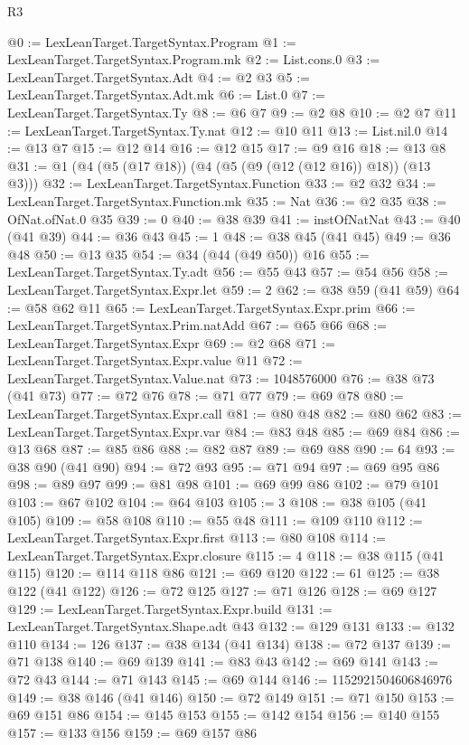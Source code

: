 \begin{lexlean}{R3}
\begin{coremodule}
@0 := LexLeanTarget.TargetSyntax.Program
@1 := LexLeanTarget.TargetSyntax.Program.mk
@2 := List.cons.{0}
@3 := LexLeanTarget.TargetSyntax.Adt
@4 := @2 @3
@5 := LexLeanTarget.TargetSyntax.Adt.mk
@6 := List.{0}
@7 := LexLeanTarget.TargetSyntax.Ty
@8 := @6 @7
@9 := @2 @8
@10 := @2 @7
@11 := LexLeanTarget.TargetSyntax.Ty.nat
@12 := @10 @11
@13 := List.nil.{0}
@14 := @13 @7
@15 := @12 @14
@16 := @12 @15
@17 := @9 @16
@18 := @13 @8
@31 := @1 (@4 (@5 (@17 @18)) (@4 (@5 (@9 (@12 (@12 @16)) @18)) (@13 @3)))
@32 := LexLeanTarget.TargetSyntax.Function
@33 := @2 @32
@34 := LexLeanTarget.TargetSyntax.Function.mk
@35 := Nat
@36 := @2 @35
@38 := OfNat.ofNat.{0} @35
@39 := 0
@40 := @38 @39
@41 := instOfNatNat
@43 := @40 (@41 @39)
@44 := @36 @43
@45 := 1
@48 := @38 @45 (@41 @45)
@49 := @36 @48
@50 := @13 @35
@54 := @34 (@44 (@49 @50)) @16
@55 := LexLeanTarget.TargetSyntax.Ty.adt
@56 := @55 @43
@57 := @54 @56
@58 := LexLeanTarget.TargetSyntax.Expr.let
@59 := 2
@62 := @38 @59 (@41 @59)
@64 := @58 @62 @11
@65 := LexLeanTarget.TargetSyntax.Expr.prim
@66 := LexLeanTarget.TargetSyntax.Prim.natAdd
@67 := @65 @66
@68 := LexLeanTarget.TargetSyntax.Expr
@69 := @2 @68
@71 := LexLeanTarget.TargetSyntax.Expr.value @11
@72 := LexLeanTarget.TargetSyntax.Value.nat
@73 := 1048576000
@76 := @38 @73 (@41 @73)
@77 := @72 @76
@78 := @71 @77
@79 := @69 @78
@80 := LexLeanTarget.TargetSyntax.Expr.call
@81 := @80 @48
@82 := @80 @62
@83 := LexLeanTarget.TargetSyntax.Expr.var
@84 := @83 @48
@85 := @69 @84
@86 := @13 @68
@87 := @85 @86
@88 := @82 @87
@89 := @69 @88
@90 := 64
@93 := @38 @90 (@41 @90)
@94 := @72 @93
@95 := @71 @94
@97 := @69 @95 @86
@98 := @89 @97
@99 := @81 @98
@101 := @69 @99 @86
@102 := @79 @101
@103 := @67 @102
@104 := @64 @103
@105 := 3
@108 := @38 @105 (@41 @105)
@109 := @58 @108
@110 := @55 @48
@111 := @109 @110
@112 := LexLeanTarget.TargetSyntax.Expr.first
@113 := @80 @108
@114 := LexLeanTarget.TargetSyntax.Expr.closure
@115 := 4
@118 := @38 @115 (@41 @115)
@120 := @114 @118 @86
@121 := @69 @120
@122 := 61
@125 := @38 @122 (@41 @122)
@126 := @72 @125
@127 := @71 @126
@128 := @69 @127
@129 := LexLeanTarget.TargetSyntax.Expr.build
@131 := LexLeanTarget.TargetSyntax.Shape.adt @43
@132 := @129 @131
@133 := @132 @110
@134 := 126
@137 := @38 @134 (@41 @134)
@138 := @72 @137
@139 := @71 @138
@140 := @69 @139
@141 := @83 @43
@142 := @69 @141
@143 := @72 @43
@144 := @71 @143
@145 := @69 @144
@146 := 1152921504606846976
@149 := @38 @146 (@41 @146)
@150 := @72 @149
@151 := @71 @150
@153 := @69 @151 @86
@154 := @145 @153
@155 := @142 @154
@156 := @140 @155
@157 := @133 @156
@159 := @69 @157 @86

\end{coremodule}
\end{lexlean}
